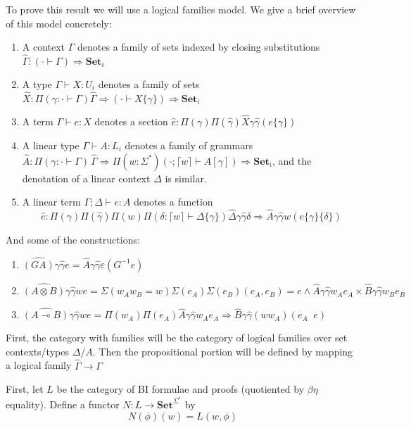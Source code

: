 \documentclass[sigconf,anonymous,review,screen]{acmart}
\newcommand{\lto}{\multimap}
\newcommand{\Set}{\mathbf{Set}}
\newcommand{\simulsubst}[2]{#1\{#2\}}
\newcommand{\applto}[2]{#1 \mathop{{}^{\lto}} #2}
\begin{document}
To prove this result we will use a logical families model. We give a
brief overview of this model concretely:
\begin{enumerate}
\item A context $\Gamma$ denotes a family of sets indexed by closing substitutions $\hat\Gamma : (\cdot \vdash \Gamma) \Rightarrow \Set_i$
\item A type $\Gamma \vdash X : U_i$ denotes a family of sets $\hat X : \Pi(\gamma:\cdot \vdash \Gamma) \hat\Gamma \Rightarrow (\cdot \vdash \simulsubst X \gamma) \Rightarrow \Set_i$
\item A term $\Gamma \vdash e : X$ denotes a section $\hat e : \Pi(\gamma)\Pi(\hat\gamma)\hat X \gamma \hat\gamma (\simulsubst e \gamma)$
\item A linear type $\Gamma \vdash A : L_i$ denotes a family of grammars $\hat A : \Pi(\gamma:\cdot\vdash\Gamma)\,\hat\Gamma \Rightarrow \Pi(w:\Sigma^*) (\cdot;\lceil w\rceil \vdash A[\gamma])\Rightarrow \Set_i$, and the denotation of a linear context $\Delta$ is similar.
\item A linear term $\Gamma;\Delta \vdash e : A$ denotes a function \[\hat e : \Pi(\gamma)\Pi(\hat\gamma)\Pi(w)\Pi(\delta : \lceil w \rceil \vdash \simulsubst \Delta \gamma) \hat\Delta \gamma \hat\gamma \delta \Rightarrow \hat A \gamma \hat\gamma w {(\simulsubst {\simulsubst e \gamma} \delta)}\]
\end{enumerate}
And some of the constructions:
\begin{enumerate}
\item $\widehat {(G A)} \gamma \hat\gamma e = \hat A \gamma \hat\gamma \varepsilon (G^{-1}e)$
\item $\widehat {(A \otimes B)} \gamma \hat\gamma w e = \Sigma(w_Aw_B = w)\Sigma(e_A)\Sigma(e_B) (e_A,e_B) = e \wedge \hat A \gamma \hat \gamma w_A e_A \times \hat B \gamma \hat \gamma w_B e_B$
\item $\widehat {(A \lto B)} \gamma \hat\gamma w e = \Pi(w_A)\Pi(e_A) \hat A \gamma\hat\gamma w_A e_A \Rightarrow \hat B \gamma\hat\gamma (ww_A) (\applto {e_A} e)$
\end{enumerate}

First, the category with families will be
the category of logical families over set contexts/types
$\Delta$/$A$. Then the propositional portion will be defined by
mapping a logical family $\hat \Gamma \to \Gamma$ 

First, let $L$ be the category of BI formulae and proofs (quotiented
by $\beta\eta$ equality). Define a functor $N : L \to \Set^{\Sigma^*}$ by
\[ N(\phi)(w) = L(w,\phi) \]
\end{document}
